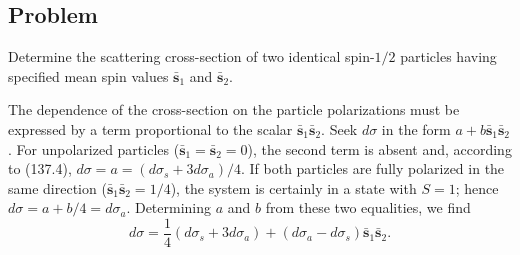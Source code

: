\subsection*{Problem}

\ProblemHeading Determine the scattering cross-section of two identical
spin-$1/2$ particles having specified mean spin values
$\bar{\mathbf s}_1$ and $\bar{\mathbf s}_2$.

\SolutionHeading The dependence of the cross-section on the particle
polarizations must be expressed by a term proportional to the scalar
$\bar{\mathbf s}_1\bar{\mathbf s}_2$. Seek $d\sigma$ in the form
$a+b\bar{\mathbf s}_1\bar{\mathbf s}_2$. For unpolarized particles
($\bar{\mathbf s}_1=\bar{\mathbf s}_2=0$), the second term is absent and,
according to (137.4),
$d\sigma=a=(d\sigma_s+3d\sigma_a)/4$. If both particles are fully polarized
in the same direction ($\bar{\mathbf s}_1\bar{\mathbf s}_2=1/4$), the system
is certainly in a state with $S=1$; hence
$d\sigma=a+b/4=d\sigma_a$. Determining $a$ and $b$ from these two equalities,
we find
\[
 d\sigma=\frac14(d\sigma_s+3d\sigma_a)
 +(d\sigma_a-d\sigma_s)\bar{\mathbf s}_1\bar{\mathbf s}_2.
\]

